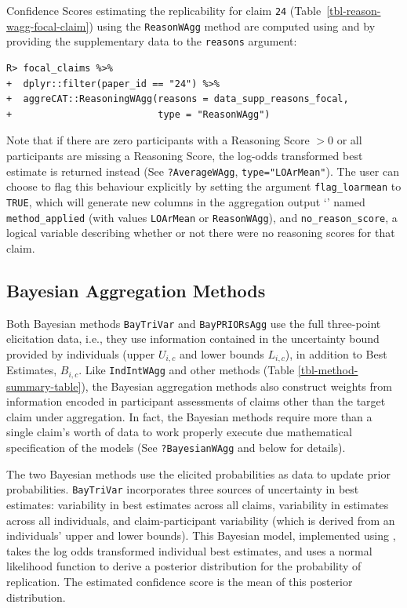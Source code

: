 \documentclass[article]{jss}
\newcommand{\class}[1]{`\code{#1}'}
\newcommand{\fct}[1]{\code{#1()}}
\begin{document}
Confidence Scores estimating the replicability for claim \texttt{24}
(Table~\ref{tbl-reason-wagg-focal-claim}) using the \texttt{ReasonWAgg}
method are computed using \fct{ReasoningWAgg} and by providing the
supplementary data to the \texttt{reasons} argument:

\begin{verbatim}
R> focal_claims %>% 
+  dplyr::filter(paper_id == "24") %>% 
+  aggreCAT::ReasoningWAgg(reasons = data_supp_reasons_focal,
+                          type = "ReasonWAgg")
\end{verbatim}

Note that if there are zero participants with a Reasoning Score \(>0\)
or all participants are missing a Reasoning Score, the log-odds
transformed best estimate is returned instead (See
\texttt{?AverageWAgg}, \texttt{type="LOArMean"}). The user can choose to
flag this behaviour explicitly by setting the argument
\texttt{flag\_loarmean} to \texttt{TRUE}, which will generate new
columns in the aggregation output \class{data.frame} named
\texttt{method\_applied} (with values \texttt{LOArMean} or
\texttt{ReasonWAgg}), and \texttt{no\_reason\_score}, a logical variable
describing whether or not there were no reasoning scores for that claim.

\hypertarget{bayesian-aggregation-methods}{%
\subsection{Bayesian Aggregation
Methods}\label{bayesian-aggregation-methods}}

Both Bayesian methods \texttt{BayTriVar} and \texttt{BayPRIORsAgg} use
the full three-point elicitation data, i.e., they use information
contained in the uncertainty bound provided by individuals (upper
\({U}_{i,c}\) and lower bounds \({L}_{i,c}\)), in addition to Best
Estimates, \(B_{i,c}\). Like \texttt{IndIntWAgg} and other methods
(Table \ref{tbl-method-summary-table}), the Bayesian aggregation methods
also construct weights from information encoded in participant
assessments of claims other than the target claim under aggregation. In
fact, the Bayesian methods require more than a single claim's worth of
data to work properly execute due mathematical specification of the
models (See \texttt{?BayesianWAgg} and below for details).

The two Bayesian methods use the elicited probabilities as data to
update prior probabilities. \texttt{BayTriVar} incorporates three
sources of uncertainty in best estimates: variability in best estimates
across all claims, variability in estimates across all individuals, and
claim-participant variability (which is derived from an individuals'
upper and lower bounds). This Bayesian model, implemented using
 \citep{R2JAGS}, takes the log odds transformed individual
best estimates, and uses a normal likelihood function to derive a
posterior distribution for the probability of replication. The estimated
confidence score is the mean of this posterior distribution.
\end{document}

